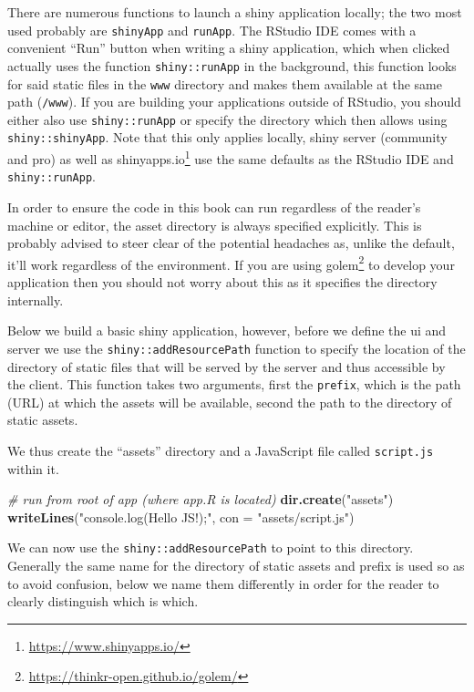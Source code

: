 \documentclass[
]{krantz}
\makeatletter
\newenvironment{Shaded}{\begin{snugshade}}{\end{snugshade}}
\newcommand{\CommentTok}[1]{\textcolor[rgb]{0.37,0.37,0.37}{\textit{#1}}}
\newcommand{\DataTypeTok}[1]{\textcolor[rgb]{0.27,0.27,0.27}{#1}}
\newcommand{\KeywordTok}[1]{\textcolor[rgb]{0.27,0.27,0.27}{\textbf{#1}}}
\newcommand{\NormalTok}[1]{#1}
\newcommand{\StringTok}[1]{\textcolor[rgb]{0.5,0.5,0.5}{#1}}
\renewcommand{\href}[2]{#2\footnote{\url{#1}}}
\newenvironment{kframe}{%
\medskip{}
\setlength{\fboxsep}{.8em}
 \def\at@end@of@kframe{}%
 \ifinner\ifhmode%
  \def\at@end@of@kframe{\end{minipage}}%
  \begin{minipage}{\columnwidth}%
 \fi\fi%
 \def\FrameCommand##1{\hskip\@totalleftmargin \hskip-\fboxsep
 \colorbox{shadecolor}{##1}\hskip-\fboxsep
     \hskip-\linewidth \hskip-\@totalleftmargin \hskip\columnwidth}%
 \MakeFramed {\advance\hsize-\width
   \@totalleftmargin\z@ \linewidth\hsize
   \@setminipage}}%
 {\par\unskip\endMakeFramed%
 \at@end@of@kframe}
\renewenvironment{Shaded}{\begin{kframe}}{\end{kframe}}
\makeatother
\begin{document}
There are numerous functions to launch a shiny application locally; the two most used probably are \texttt{shinyApp} and \texttt{runApp}. The RStudio IDE comes with a convenient ``Run'' button when writing a shiny application, which when clicked actually uses the function \texttt{shiny::runApp} in the background, this function looks for said static files in the \texttt{www} directory and makes them available at the same path (\texttt{/www}). If you are building your applications outside of RStudio, you should either also use \texttt{shiny::runApp} or specify the directory which then allows using \texttt{shiny::shinyApp}. Note that this only applies locally, shiny server (community and pro) as well as \href{https://www.shinyapps.io/}{shinyapps.io} use the same defaults as the RStudio IDE and \texttt{shiny::runApp}.

In order to ensure the code in this book can run regardless of the reader's machine or editor, the asset directory is always specified explicitly. This is probably advised to steer clear of the potential headaches as, unlike the default, it'll work regardless of the environment. If you are using \href{https://thinkr-open.github.io/golem/}{golem} \citep{R-golem} to develop your application then you should not worry about this as it specifies the directory internally.

Below we build a basic shiny application, however, before we define the ui and server we use the \texttt{shiny::addResourcePath} function to specify the location of the directory of static files that will be served by the server and thus accessible by the client. This function takes two arguments, first the \texttt{prefix}, which is the path (URL) at which the assets will be available, second the path to the directory of static assets.

We thus create the ``assets'' directory and a JavaScript file called \texttt{script.js} within it.

\begin{Shaded}
\begin{Highlighting}[]
\CommentTok{\# run from root of app (where app.R is located)}
\KeywordTok{dir.create}\NormalTok{(}\StringTok{"assets"}\NormalTok{)}
\KeywordTok{writeLines}\NormalTok{(}\StringTok{"console.log(\textquotesingle{}Hello JS!\textquotesingle{});"}\NormalTok{, }\DataTypeTok{con =} \StringTok{"assets/script.js"}\NormalTok{)}
\end{Highlighting}
\end{Shaded}

We can now use the \texttt{shiny::addResourcePath} to point to this directory. Generally the same name for the directory of static assets and prefix is used so as to avoid confusion, below we name them differently in order for the reader to clearly distinguish which is which.
\end{document}
